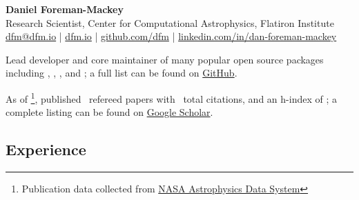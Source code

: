 \documentclass[11pt,letterpaper]{article}
\begin{document}
\thispagestyle{empty}\sloppy\sloppypar\raggedbottom

\textbf{\Large Daniel Foreman-Mackey} \\[0.5ex]
Research Scientist, Center for Computational Astrophysics, Flatiron Institute \\
\textsf{\small %
\href{mailto:dfm@dfm.io}{dfm@dfm.io} | %
\href{https://dfm.io}{dfm.io} | %
\href{https://github.com/dfm}{github.com/dfm} | %
\href{https://www.linkedin.com/in/dan-foreman-mackey/}{linkedin.com/in/dan-foreman-mackey} %
}\\[0.5ex]


\vspace{1ex}
\begin{list}{}{\cvlist}
    \item Lead developer and core maintainer of many popular open source packages including \href{https://github.com/dfm/emcee}{}, \href{https://github.com/dfm/tinygp}{}, \href{https://github.com/dfm/corner.py}{}, and \href{https://github.com/showyourwork/showyourwork}{}; a full list can be found on \href{https://github.com/dfm}{GitHub}.
    \item As of \pubsdate\footnote{Publication data collected from \href{https://ui.adsabs.harvard.edu/}{NASA Astrophysics Data System}}, published \pubsnumber\ refereed papers with \pubscitations\ total citations, and an h-index of \pubshindex; a complete listing can be found on \href{https://scholar.google.com/citations?user=oMqNbfsAAAAJ}{Google Scholar}.
\end{list}

\subsection{Experience}
\end{document}
